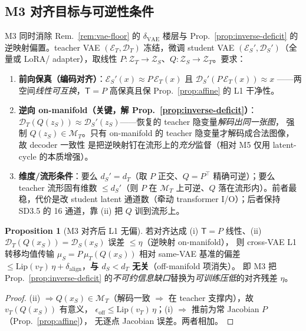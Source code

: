 \documentclass[11pt,a4paper]{article}
\newcommand{\Enc}{\mathcal{E}}
\newcommand{\Dec}{\mathcal{D}}
\newcommand{\Zt}{\mathcal{Z}_T}
\newcommand{\Zs}{\mathcal{Z}_S}
\newcommand{\Tmap}{\mathsf{T}}
\newcommand{\vT}{v_{T}}
\theoremstyle{definition}
\newtheorem{proposition}{Proposition}
\begin{document}
\subsection{M3 对齐目标与可逆性条件}

M3 同时消除 Rem.~\ref{rem:vae-floor} 的 $\delta_{\mathrm{VAE}}$ 楼层与 Prop.~\ref{prop:inverse-deficit}
的逆映射偏置。teacher VAE $(\Enc_T,\Dec_T)$ 冻结，微调 student VAE $(\Enc_S',\Dec_S')$（全量或 LoRA/
adapter），取线性 $P:\Zt\to\Zs$、$Q:\Zs\to\Zt$。要求：

\begin{enumerate}[leftmargin=1.6em]
\item \textbf{前向保真（编码对齐）}：$\Enc_S'(x)\approx P\,\Enc_T(x)$ 且 $\Dec_S'(P\,\Enc_T(x))\approx x$
——两空间\emph{线性可互换}，$\Tmap{=}P$ 高保真且保 Prop.~\ref{prop:affine} 的 L1 干净性。
\item \textbf{逆向 on-manifold（关键，解 Prop.~\ref{prop:inverse-deficit}）}：
$\Dec_T(Q(z_S))\approx\Dec_S'(z_S)$——恢复的 teacher 隐变量\emph{解码出同一张图}，
强制 $Q(z_S)\in\mathcal{M}_T$。只有 on-manifold 的 teacher 隐变量才解码成合法图像，故 decoder 一致性
是把逆映射钉在流形上的\emph{充分}监督（相对 M5 仅用 latent-cycle 的本质增强）。
\item \textbf{维度/流形条件}：要么 $d_S'{=}d_T$（取 $P$ 正交、$Q{=}P^\top$ 精确可逆）；要么 teacher
流形固有维数 $\le d_S'$（则 $P$ 在 $\mathcal{M}_T$ 上可逆、$Q$ 落在流形内）。前者最稳，代价是改 student
latent 通道数（牵动 transformer I/O）；后者保持 SD3.5 的 16 通道，靠 (ii) 把 $Q$ 训到流形上。
\end{enumerate}

\begin{proposition}[M3 对齐后 L1 无偏]
\label{prop:m3-unbiased}
若对齐达成 (i) $\Tmap{=}P$ 线性、(ii) $\Dec_T(Q(x_S))=\Dec_S(x_S)$ 误差 $\le\eta$（逆映射 on-manifold），
则 cross-VAE L1 转移均值传输 $\mu_S=P\,\mu_T(Q(x_S))$ 相对 same-VAE 基准的偏差
$\le \mathrm{Lip}(\vT)\,\eta+\delta_{\mathrm{align}}$，\textbf{与 $d_S<d_T$ 无关}（off-manifold 项消失）。
即 M3 把 Prop.~\ref{prop:inverse-deficit} 的\emph{不可约信息缺口}替换为\emph{可训练压低}的对齐残差 $\eta$。
\end{proposition}
\begin{proof}
(ii) $\Rightarrow Q(x_S)\in\mathcal{M}_T$（解码一致 $\Rightarrow$ 在 teacher 支撑内），故 $\vT(Q(x_S))$ 有意义，
$\epsilon_{\mathrm{off}}\le\mathrm{Lip}(\vT)\,\eta$；(i) $\Rightarrow$ 推前为常 Jacobian $P$（Prop.~\ref{prop:affine}），
无逐点 Jacobian 误差。两者相加。\end{proof}
\end{document}
